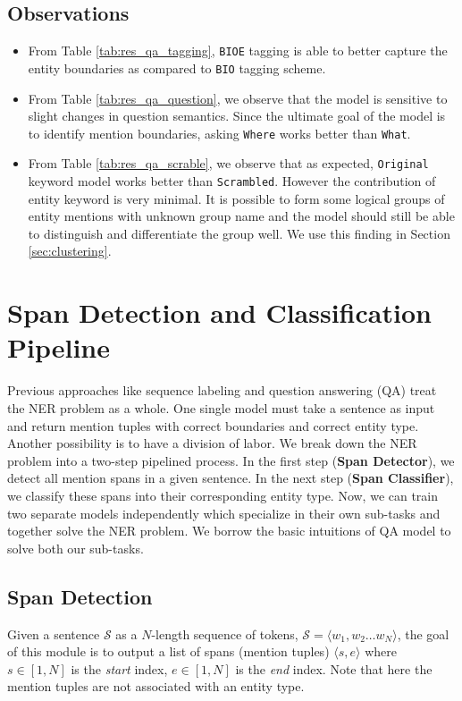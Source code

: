 \subsection{Observations}
\begin{itemize}
    \item From Table \ref{tab:res_qa_tagging}, \texttt{BIOE} tagging is able to better capture the entity boundaries as compared to \texttt{BIO} tagging scheme.
    
    \item From Table \ref{tab:res_qa_question}, we observe that the model is sensitive to slight changes in question semantics. Since the ultimate goal of the model is to identify mention boundaries, asking \texttt{Where} works better than \texttt{What}. 
    
    \item From Table \ref{tab:res_qa_scrable}, we observe that as expected, \texttt{Original} keyword model works better than \texttt{Scrambled}. However the contribution of entity keyword is very minimal. It is possible to form some logical groups of entity mentions with unknown group name and the model should still be able to distinguish and differentiate the group well. We use this finding in Section \ref{sec:clustering}.
\end{itemize}

\section{Span Detection and Classification Pipeline}
\label{sec:span_pipeline}

Previous approaches like sequence labeling and question answering (QA) treat the NER problem as a whole. One single model must take a sentence as input and return mention tuples with correct boundaries and correct entity type. Another possibility is to have a division of labor. We break down the NER problem into a two-step pipelined process. In the first step (\textbf{Span Detector}), we detect all mention spans in a given sentence. In the next step (\textbf{Span Classifier}), we classify these spans into their corresponding entity type. Now, we can train two separate models independently which specialize in their own sub-tasks and together solve the NER problem. We borrow the basic intuitions of QA model to solve both our sub-tasks.

\subsection{Span Detection}
Given a sentence $\mathcal{S}$ as a $N$-length sequence of tokens, $\mathcal{S} = \langle w_1, w_2 \ldots w_N \rangle$, the goal of this module is to output a list of spans (mention tuples) $\langle s, e\rangle$ where $s \in [1, N]$ is the \textit{start} index, $e \in [1, N]$ is the \textit{end} index. Note that here the mention tuples are not associated with an entity type. 

